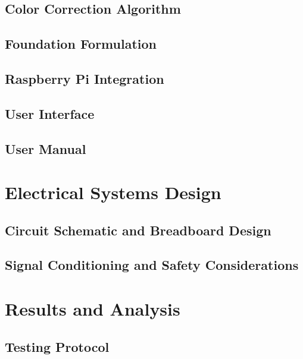 \documentclass[12pt, letterpaper]{report}
\begin{document}
    \section{Color Correction Algorithm}

    \section{Foundation Formulation}

    \section{Raspberry Pi Integration}

    \section{User Interface}

    \section{User Manual}


    \chapter{Electrical Systems Design}

    \section{Circuit Schematic and Breadboard Design}

    \section{Signal Conditioning and Safety Considerations}


    \chapter{Results and Analysis}

    \section{Testing Protocol}
\end{document}
